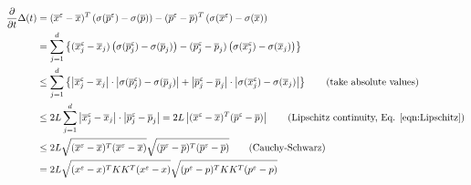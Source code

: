 \documentclass[11pt]{article}
\begin{document}
\begin{equation}
    \begin{aligned}
        \frac{\partial}{\partial t}\Delta(t) & =  (\overline{x}^\varepsilon-\overline{x})^T\left(\sigma(\overline{p}^\varepsilon)-\sigma(\overline{p})\right)
        - (\overline{p}^\varepsilon-\overline{p})^T\left(\sigma(\overline{x}^\varepsilon)-\sigma(\overline{x})\right)                                                                                                           \\
                                             & = \sum_{j=1}^d \left\{  (\overline{x}^\varepsilon_j-\overline{x}_j)\left(\sigma(\overline{p}^\varepsilon_j)-\sigma(\overline{p}_j)\right)
        - (\overline{p}^\varepsilon_j-\overline{p}_j)\left(\sigma(\overline{x}^\varepsilon_j)-\sigma(\overline{x}_j)\right)\right\}                                                                                             \\
                                             & \le \sum_{j=1}^d \left\{ \left|\overline{x}^\varepsilon_j-\overline{x}_j\right|\cdot \left|\sigma(\overline{p}^\varepsilon_j)-\sigma(\overline{p}_j)\right|
        + \left|\overline{p}^\varepsilon_j-\overline{p}_j\right|\cdot \left|\sigma(\overline{x}^\varepsilon_j)-\sigma(\overline{x}_j)\right|\right\}      \qquad\text{(take absolute values)}                                   \\
                                             & \le 2 L \sum_{j=1}^d \left|\overline{x}^\varepsilon_j-\overline{x}_j\right| \cdot
        \left|\overline{p}^\varepsilon_j-\overline{p}_j\right| = 2 L
        \left|(\overline{x}^\varepsilon-\overline{x})^T
        (\overline{p}^\varepsilon-\overline{p})\right|                     \qquad\text{(Lipschitz continuity, Eq. \eqref{eqn:Lipschitz})}                                                                                       \\
                                             & \le 2L \sqrt{(\overline{x}^\varepsilon-\overline{x})^T(\overline{x}^\varepsilon-\overline{x})}
        \sqrt{(\overline{p}^\varepsilon-\overline{p})^T(\overline{p}^\varepsilon-\overline{p})}       \qquad\text{(Cauchy-Schwarz)}                                                                                             \\
                                             & = 2L \sqrt{(x^\varepsilon-x)^TKK^T(x^\varepsilon-x)}
        \sqrt{(p^\varepsilon-p)^TKK^T(p^\varepsilon-p)}                                                                                                                                                                         \\

\end{aligned}
\end{equation}
\end{document}

